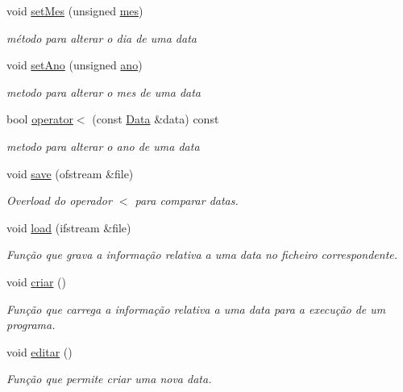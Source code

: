 \begin{DoxyCompactItemize}
void \hyperlink{class_data_ac886172612a1bd81f1d266c4f5f94377}{set\+Mes} (unsigned \hyperlink{class_data_a586deb479ec2031a0d3ceec8280f7706}{mes})
\begin{DoxyCompactList}\small\item\em método para alterar o dia de uma data \end{DoxyCompactList}\item 
void \hyperlink{class_data_a5ad712f23c932ee4d515213f7c66f60e}{set\+Ano} (unsigned \hyperlink{class_data_a1811fab972bdf6ed644c4eb7412bd043}{ano})
\begin{DoxyCompactList}\small\item\em metodo para alterar o mes de uma data \end{DoxyCompactList}\item 
bool \hyperlink{class_data_a54019a127c7262ad527e523b98ddd26a}{operator$<$} (const \hyperlink{class_data}{Data} \&data) const 
\begin{DoxyCompactList}\small\item\em metodo para alterar o ano de uma data \end{DoxyCompactList}\item 
void \hyperlink{class_data_af215a52677977e69efbcab64fa9300e8}{save} (ofstream \&file)
\begin{DoxyCompactList}\small\item\em Overload do operador $<$ para comparar datas. \end{DoxyCompactList}\item 
void \hyperlink{class_data_a12855e1e008ed1aecd58b41727c4774b}{load} (ifstream \&file)
\begin{DoxyCompactList}\small\item\em Função que grava a informação relativa a uma data no ficheiro correspondente. \end{DoxyCompactList}\item 
void \hyperlink{class_data_a49854285a6916770352d131eb96e9bb6}{criar} ()
\begin{DoxyCompactList}\small\item\em Função que carrega a informação relativa a uma data para a execução de um programa. \end{DoxyCompactList}\item 
void \hyperlink{class_data_a825a14af1b07c88040d8bc96a4833f3a}{editar} ()
\begin{DoxyCompactList}\small\item\em Função que permite criar uma nova data. \end{DoxyCompactList}\item 

\end{DoxyCompactItemize}

